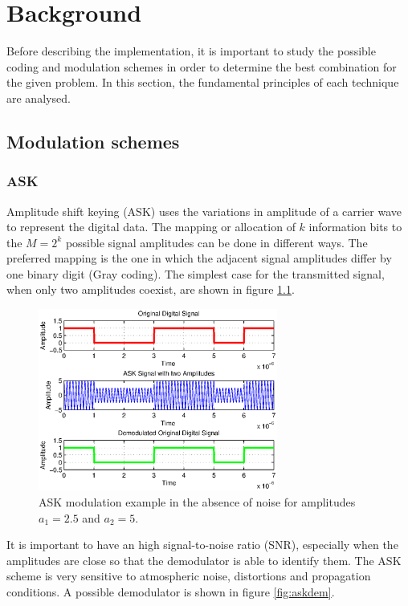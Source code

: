 \documentclass[12pt,a4paper,openright]{report}
\begin{document}
\chapter{Background} %
\label{chap:Background}
Before describing the implementation, it is important to study the possible coding and modulation schemes in order to determine the best combination for the given problem. In this section, the fundamental principles of each technique are analysed.

\section{Modulation schemes}

\subsection{ASK}
Amplitude shift keying (ASK) uses the variations in amplitude of a carrier wave to represent the digital data. The mapping or allocation of $k$ information bits to the $M=2^k$ possible signal amplitudes can be done in different ways. The preferred mapping is the one in which the adjacent  signal amplitudes differ by one binary digit (Gray coding). The simplest case for the transmitted signal, when only two amplitudes coexist, are shown in figure \ref{fig:ask}. 

\begin{figure}[h]
  \centering
    \includegraphics[width=0.7\textwidth]{ASKexample.eps}
    \caption[ASK modulation example]{ASK modulation example in the absence of noise for amplitudes $a_1=2.5$ and $a_2=5$.}
    \label{fig:ask}
\end{figure}

It is important to have an high signal-to-noise ratio (SNR), especially when the amplitudes are close so that the demodulator is able to identify them. The ASK scheme is very sensitive to atmospheric noise, distortions and propagation conditions.  A possible demodulator is shown in figure \ref{fig:askdem}.
\end{document}
